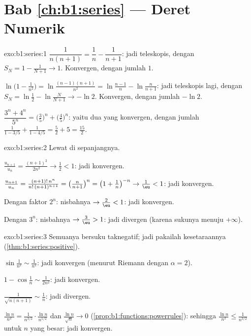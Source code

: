\section*{Bab \ref{ch:b1:series} --- Deret Numerik}

\begin{solution}{exo:b1:series:1}
$\dfrac{1}{n(n+1)} = \dfrac1n - \dfrac{1}{n+1}$: jadi teleskopis, dengan $S_N =
1 - \frac{1}{N+1} \to 1$. Konvergen, dengan jumlah $1$.

$\ln\bigl(1 - \frac{1}{n^2}\bigr) = \ln\frac{(n-1)(n+1)}{n^2} =
\ln\frac{n-1}{n} - \ln\frac{n}{n+1}$: jadi teleskopis lagi, dengan $S_N =
\ln\frac12 - \ln\frac{N}{N+1} \to -\ln 2$. Konvergen, dengan jumlah $-\ln 2$.

$\dfrac{3^n + 4^n}{5^n} = \bigl(\frac35\bigr)^n +
\bigl(\frac45\bigr)^n$: yaitu dua  yang konvergen, dengan jumlah
$\frac{1}{1 - 3/5} + \frac{1}{1 - 4/5} = \frac52 + 5 = \frac{15}{2}$.
\end{solution}

\begin{solution}{exo:b1:series:2}
Lewat  di sepanjangnya.

$\frac{u_{n+1}}{u_n} = \frac{(n+1)^2}{2n^2} \to \frac12 < 1$:
jadi konvergen.

$\frac{u_{n+1}}{u_n} = \frac{(n+1)!\,n^n}{n!\,(n+1)^{n+1}} =
\bigl(\frac{n}{n+1}\bigr)^n = \bigl(1 + \frac1n\bigr)^{-n} \to
\frac1\eu < 1$: jadi konvergen.

Dengan faktor $2^n$: nisbahnya $\to \frac2\eu < 1$: jadi konvergen.

Dengan $3^n$: nisbahnya $\to \frac3\eu > 1$: jadi divergen (karena sukunya menuju
$+\infty$).
\end{solution}

\begin{solution}{exo:b1:series:3}
Semuanya bersuku taknegatif; jadi pakailah kesetaraannya
(\cref{thm:b1:series:positive}).

$\sin\frac{1}{n^2} \sim \frac{1}{n^2}$: jadi konvergen (menurut Riemann dengan $\alpha
= 2$).

$1 - \cos\frac1n \sim \frac{1}{2n^2}$: jadi konvergen.

$\frac{1}{\sqrt{n(n+1)}} \sim \frac1n$: jadi divergen.

$\frac{\ln n}{n^2} = \frac{1}{n^{3/2}}\cdot\frac{\ln n}{n^{1/2}}$
dan $\frac{\ln n}{\sqrt n} \to 0$
(\cref{prop:b1:functions:powerrules}): sehingga $\frac{\ln n}{n^2} \leq
\frac{1}{n^{3/2}}$ untuk $n$ yang besar: jadi konvergen.
\end{solution}

